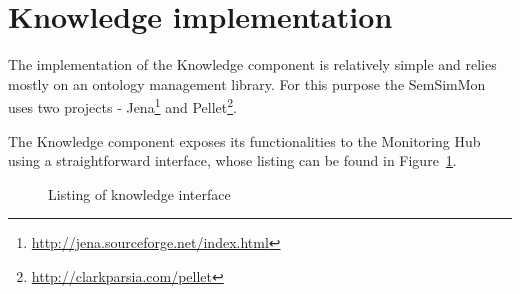 \section{Knowledge implementation}

The implementation of the Knowledge component is relatively simple and relies mostly on an ontology management library. For this purpose the SemSimMon uses two projects - Jena\footnote{\url{http://jena.sourceforge.net/index.html}} and Pellet\footnote{\url{http://clarkparsia.com/pellet}}. 

The Knowledge component exposes its functionalities to the Monitoring Hub using a straightforward interface, whose listing can be found in Figure~\ref{fig:iknowledge_java}.

\begin{figure}[ht]
  \centering
  
  \caption{Listing of knowledge interface}
  \label{fig:iknowledge_java}
\end{figure} 
